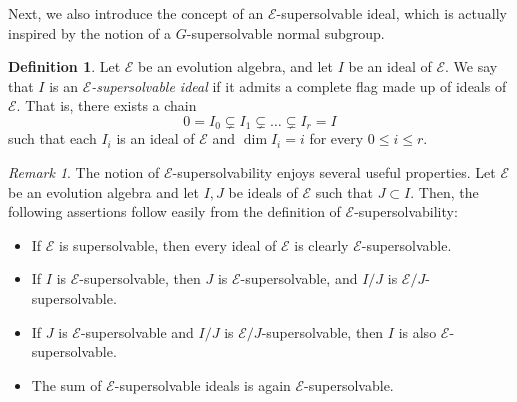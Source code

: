 \documentclass[12pt,reqno]{amsart}
\theoremstyle{definition}
\newtheorem{definition}[theorem]{Definition}
\theoremstyle{remark}
\newtheorem{remark}[theorem]{Remark}
\numberwithin{equation}{section}
\begin{document}
Next, we also introduce the concept of an $\mathcal{E}$-supersolvable ideal, which is actually inspired by the notion of a $G$-supersolvable normal subgroup.

\begin{definition}
	Let $\mathcal{E}$ be an evolution algebra, and let $I$ be an ideal of $\mathcal{E}$. We say that $I$ is an \textit{$\mathcal{E}$-supersolvable ideal} if it admits a complete flag made up of ideals of $\mathcal{E}$. That is, there exists a chain \[0=I_0\subsetneq I_1\subsetneq\dots\subsetneq I_r=I\] such that each $I_i$ is an ideal of $\mathcal{E}$ and $\dim{I_i}=i$ for every $0\leq i\leq r$. 
\end{definition}
\begin{remark}
 The notion of $\mathcal{E}$-supersolvability enjoys several useful properties.
 Let $\mathcal{E}$ be an evolution algebra and let $I,J$ be ideals of $\mathcal{E}$ such that $J\subset I$. Then, the following assertions follow easily from the definition of $\mathcal{E}$-supersolvability:
\begin{itemize}
	\item If $\mathcal{E}$ is supersolvable, then every ideal of $\mathcal{E}$ is clearly $\mathcal{E}$-supersolvable.
	\item If $I$ is $\mathcal{E}$-supersolvable, then  $J$ is $\mathcal{E}$-supersolvable, and $I/J$ is $\mathcal{E}/J$-supersolvable.
	\item If $J$ is $\mathcal{E}$-supersolvable and $I/J$ is $\mathcal{E}/J$-supersolvable, then $I$ is also $\mathcal{E}$-supersolvable.
	\item The sum of $\mathcal{E}$-supersolvable ideals is again $\mathcal{E}$-supersolvable.
\end{itemize}
\end{remark}
\end{document}
